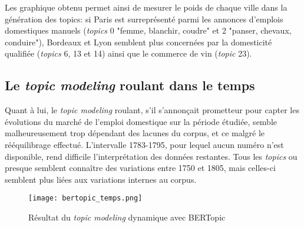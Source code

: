 Les graphique obtenu permet ainsi de mesurer le poids de chaque ville dans la génération des topics: si Paris est surreprésenté parmi les annonces d'emplois domestiques manuels (\textit{topics} 0 "femme, blanchir, coudre" et 2 "panser, chevaux, conduire"), Bordeaux et Lyon semblent plus concernées par la domesticité qualifiée (\textit{topics} 6, 13 et 14) ainsi que le commerce de vin (\textit{topic} 23).

\subsection{Le\textit{ topic modeling} roulant dans le temps}

Quant à lui, le \textit{topic modeling }roulant, s'il s'annonçait prometteur pour capter les évolutions du marché de l'emploi domestique sur la période étudiée, semble malheureusement trop dépendant des lacunes du corpus, et ce malgré le rééquilibrage effectué. L'intervalle 1783-1795, pour lequel aucun numéro n'est disponible, rend difficile l'interprétation des données restantes. Tous les \textit{topics} ou presque semblent connaître des variations entre 1750 et 1805, mais celles-ci semblent plus liées aux variations internes au corpus.


\begin{figure}[h!t]
	\centering
	\texttt{[image: bertopic\_temps.png]}
	\caption{Résultat du \textit{topic modeling} dynamique avec BERTopic}
\end{figure}